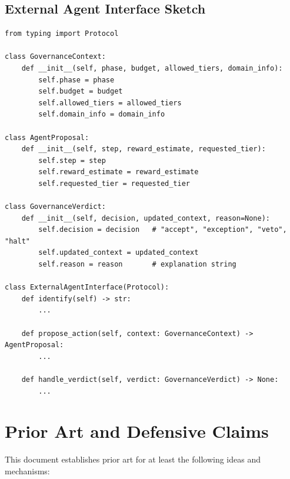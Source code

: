 \documentclass[11pt]{article}
\begin{document}
\subsection{External Agent Interface Sketch}

\begin{verbatim}
from typing import Protocol

class GovernanceContext:
    def __init__(self, phase, budget, allowed_tiers, domain_info):
        self.phase = phase
        self.budget = budget
        self.allowed_tiers = allowed_tiers
        self.domain_info = domain_info

class AgentProposal:
    def __init__(self, step, reward_estimate, requested_tier):
        self.step = step
        self.reward_estimate = reward_estimate
        self.requested_tier = requested_tier

class GovernanceVerdict:
    def __init__(self, decision, updated_context, reason=None):
        self.decision = decision   # "accept", "exception", "veto", "halt"
        self.updated_context = updated_context
        self.reason = reason       # explanation string

class ExternalAgentInterface(Protocol):
    def identify(self) -> str:
        ...

    def propose_action(self, context: GovernanceContext) -> AgentProposal:
        ...

    def handle_verdict(self, verdict: GovernanceVerdict) -> None:
        ...
\end{verbatim}

\section{Prior Art and Defensive Claims}

This document establishes prior art for at least the following ideas and mechanisms:
\end{document}
